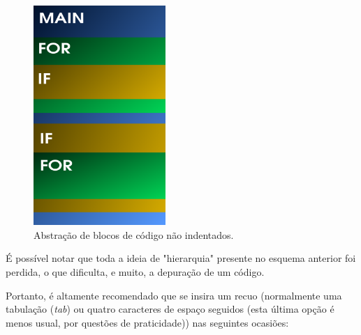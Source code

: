 \documentclass[12pt]{article}
\newcommand\tab[1][1cm]{\hspace*{#1}}
\begin{document}
\begin{figure}[H]
    \centering
    \includegraphics[width=5cm, keepaspectratio]{indentation/Indendacao_2.png}
    \caption{Abstração de blocos de código não indentados.}
    \label{fig:nao_indentado}
\end{figure}

\par\tab É possível notar que toda a ideia de "hierarquia" presente no esquema anterior foi perdida, o que dificulta, e muito, a depuração de um código.

\par\tab Portanto, é altamente recomendado que se insira um recuo (normalmente uma tabulação (\textit{tab}) ou quatro caracteres de espaço seguidos (esta última opção é menos usual, por questões de praticidade)) nas seguintes ocasiões:
\end{document}
